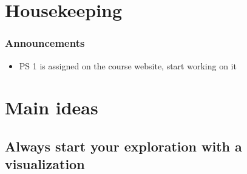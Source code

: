 \documentclass[11pt,containsverbatim,handout,xcolor=xelatex,dvipsnames,table]{beamer}
\begin{document}
\section{Housekeeping}


\begin{frame}
\frametitle{Announcements}

\begin{itemize}

\item PS 1 is assigned on the course website, start working on it

\end{itemize}

\end{frame}


\section{Main ideas}


\subsection{Always start your exploration with a visualization}
\label{mi1}

\end{document}
